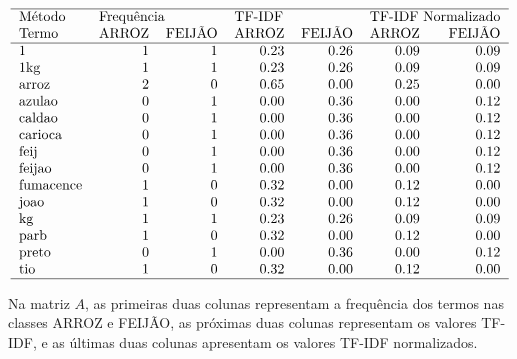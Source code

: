 \begin{table}[ht]
\centering
\caption{Matriz termo-documento com representações de frequência, TF-IDF e TF-IDF normalizado.}
\label{tab:matriz-termo-documento}
\begin{equation}
\begin{tabular}{lrrrrrr}
\hline
Método & \multicolumn{2}{l}{Frequência} & \multicolumn{2}{l}{TF-IDF} & \multicolumn{2}{l}{TF-IDF Normalizado} \\
Termo &      ARROZ & FEIJÃO &     ARROZ &    FEIJÃO &              ARROZ &    FEIJÃO \\
\hline
1         &          1 &      1 &  0.23 &  0.26 &           0.09 &  0.09 \\
1kg       &          1 &      1 &  0.23 &  0.26 &           0.09 &  0.09 \\
arroz     &          2 &      0 &  0.65 &  0.00 &           0.25 &  0.00 \\
azulao    &          0 &      1 &  0.00 &  0.36 &           0.00 &  0.12 \\
caldao    &          0 &      1 &  0.00 &  0.36 &           0.00 &  0.12 \\
carioca   &          0 &      1 &  0.00 &  0.36 &           0.00 &  0.12 \\
feij      &          0 &      1 &  0.00 &  0.36 &           0.00 &  0.12 \\
feijao    &          0 &      1 &  0.00 &  0.36 &           0.00 &  0.12 \\
fumacence &          1 &      0 &  0.32 &  0.00 &           0.12 &  0.00 \\
joao      &          1 &      0 &  0.32 &  0.00 &           0.12 &  0.00 \\
kg        &          1 &      1 &  0.23 &  0.26 &           0.09 &  0.09 \\
parb      &          1 &      0 &  0.32 &  0.00 &           0.12 &  0.00 \\
preto     &          0 &      1 &  0.00 &  0.36 &           0.00 &  0.12 \\
tio       &          1 &      0 &  0.32 &  0.00 &           0.12 &  0.00 \\
\hline
\end{tabular}
\end{equation}
\end{table}

Na matriz \( A \), as primeiras duas colunas representam a frequência dos termos nas classes ARROZ e FEIJÃO, as próximas duas colunas representam os valores TF-IDF, e as últimas duas colunas apresentam os valores TF-IDF normalizados. 


